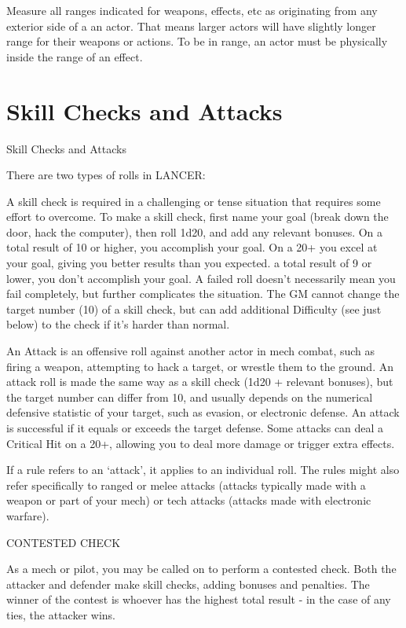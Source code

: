 Measure all ranges indicated for weapons, effects, etc as originating from any exterior side of a
an actor. That means larger actors will have slightly longer range for their weapons or actions. To
be in range, an actor must be physically inside the range of an effect.

\chapter{Skill Checks and Attacks}
   Skill Checks and Attacks

There are two types of rolls in LANCER:


A skill check is required in a challenging or tense situation that requires some effort to
overcome. To make a skill check, first name your goal (break down the door, hack the computer),
then roll 1d20, and add any relevant bonuses. On a total result of 10 or higher, you accomplish
your goal. On a 20+ you excel at your goal, giving you better results than you expected. a total
result of 9 or lower, you don’t accomplish your goal. A failed roll doesn’t necessarily mean you
fail completely, but further complicates the situation. The GM cannot change the target number
(10) of a skill check, but can add additional Difficulty (see just below) to the check if it’s harder
than normal.





An Attack is an offensive roll against another actor in mech combat, such as firing a weapon,
attempting to hack a target, or wrestle them to the ground. An attack roll is made the same way
as a skill check (1d20 + relevant bonuses), but the target number can differ from 10, and usually
depends on the numerical defensive statistic of your target, such as evasion, or electronic
defense. An attack is successful if it equals or exceeds the target defense. Some attacks can
deal a Critical Hit on a 20+, allowing you to deal more damage or trigger extra effects.


If a rule refers to an ‘attack’, it applies to an individual roll. The rules might also refer specifically
to ranged or melee attacks (attacks typically made with a weapon or part of your mech) or tech
attacks (attacks made with electronic warfare).


                                           CONTESTED CHECK

As a mech or pilot, you may be called on to perform a contested check. Both the attacker and
defender make skill checks, adding bonuses and penalties. The winner of the contest is whoever
has the highest total result - in the case of any ties, the attacker wins.


